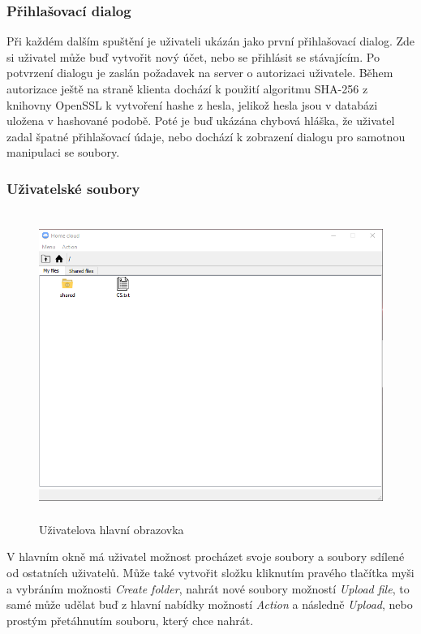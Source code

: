 \documentclass[
  glossaries,
]{kidiplom}
\begin{document}
\subsubsection{Přihlašovací dialog}
Při každém dalším spuštění je uživateli ukázán jako první přihlašovací dialog. Zde si uživatel může buď vytvořit nový účet, nebo se přihlásit se stávajícím. Po potvrzení dialogu je zaslán požadavek na server o autorizaci uživatele. Během autorizace ještě na straně klienta dochází k použití algoritmu SHA-256 \cite{SHA256} z knihovny OpenSSL \cite{OPENSSL} k vytvoření hashe z hesla, jelikož hesla jsou v databázi uložena v hashované podobě. Poté je buď ukázána chybová hláška, že uživatel zadal špatné přihlašovací údaje, nebo dochází k zobrazení dialogu pro samotnou manipulaci se soubory.
\subsubsection{Uživatelské soubory}
\begin{figure}[htp]
    \centering
    \includegraphics[width=14cm,height=10cm,keepaspectratio]{MainWindow}
    \caption{Uživatelova hlavní obrazovka}
    \label{fig:openapi}
\end{figure}
V hlavním okně má uživatel možnost procházet svoje soubory a soubory sdílené od ostatních uživatelů. Může také vytvořit složku kliknutím pravého tlačítka myši a vybráním možnosti \textit{Create folder}, nahrát nové soubory možností \textit{Upload file}, to samé může udělat buď z hlavní nabídky možností \textit{Action} a následně \textit{Upload}, nebo prostým přetáhnutím souboru, který chce nahrát.
\end{document}
